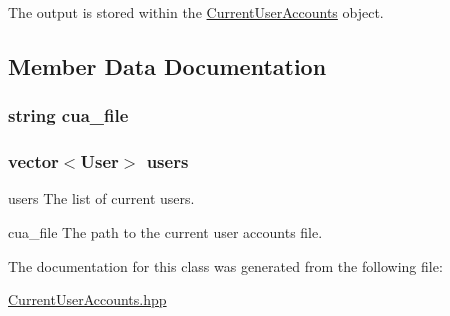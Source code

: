 The output is stored within the \hyperlink{class_current_user_accounts}{Current\-User\-Accounts} object. 

\subsection{Member Data Documentation}
\hypertarget{class_current_user_accounts_a67f6b5fde524ca7c6a05222c7847b8f5}{
\subsubsection[{cua\-\_\-file}]{\setlength{\rightskip}{0pt plus 5cm}string cua\-\_\-file\hspace{0.3cm}{\ttfamily [private]}}}\label{class_current_user_accounts_a67f6b5fde524ca7c6a05222c7847b8f5}
\hypertarget{class_current_user_accounts_a99ca3903a33c7cd9a57c4e0b402ee5b2}{
\subsubsection[{users}]{\setlength{\rightskip}{0pt plus 5cm}vector$<${\bf User}$>$ users\hspace{0.3cm}{\ttfamily [private]}}}\label{class_current_user_accounts_a99ca3903a33c7cd9a57c4e0b402ee5b2}


users The list of current users. 

cua\-\_\-file The path to the current user accounts file. 

The documentation for this class was generated from the following file\-:\begin{DoxyCompactItemize}
\item 
\hyperlink{_current_user_accounts_8hpp}{Current\-User\-Accounts.\-hpp}\end{DoxyCompactItemize}

